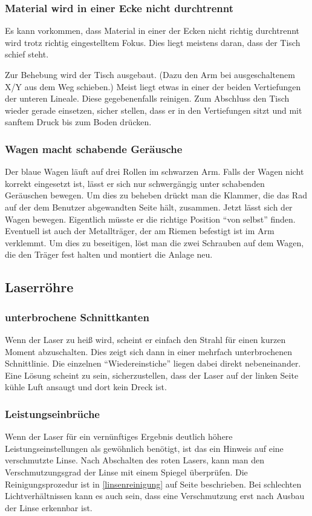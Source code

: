 \documentclass{\basedir/fablab-document}
\begin{document}
	\subsubsection{Material wird in einer Ecke nicht durchtrennt}
	Es kann vorkommen, dass Material in einer der Ecken nicht richtig durchtrennt wird trotz richtig eingestelltem Fokus. Dies liegt meistens daran, dass der Tisch schief steht.

	Zur Behebung wird der Tisch ausgebaut. (Dazu den Arm bei ausgeschaltenem X/Y aus dem Weg schieben.) Meist liegt etwas in einer der beiden Vertiefungen der unteren Lineale. Diese gegebenenfalls reinigen. Zum Abschluss den Tisch wieder gerade einsetzen, sicher stellen, dass er in den Vertiefungen sitzt und mit sanftem Druck bis zum Boden drücken.

	\subsubsection{Wagen macht schabende Geräusche}
	Der blaue Wagen läuft auf drei Rollen im schwarzen Arm. Falls der Wagen nicht korrekt eingesetzt ist, lässt er sich nur schwergängig unter schabenden Geräuschen bewegen. Um dies zu beheben drückt man die Klammer, die das Rad auf der dem Benutzer abgewandten Seite hält, zusammen. Jetzt lässt sich der Wagen bewegen. Eigentlich müsste er die richtige Position \enquote{von selbst} finden. Eventuell ist auch der Metallträger, der am Riemen befestigt ist im Arm verklemmt. Um dies zu beseitigen, löst man die zwei Schrauben auf dem Wagen, die den Träger fest halten und montiert die Anlage neu.

	\subsection{Laserröhre}
	\subsubsection{unterbrochene Schnittkanten}
	Wenn der Laser zu heiß wird, scheint er einfach den Strahl für einen kurzen Moment abzuschalten. Dies zeigt sich dann in einer mehrfach unterbrochenen Schnittlinie. Die einzelnen \enquote{Wiedereinstiche} liegen dabei direkt nebeneinander. Eine Lösung scheint zu sein, sicherzustellen, dass der Laser auf der linken Seite kühle Luft ansaugt und dort kein Dreck ist.
	\subsubsection{Leistungseinbrüche}
	Wenn der Laser für ein vernünftiges Ergebnis deutlich höhere Leistungseinstellungen als gewöhnlich benötigt, ist das ein Hinweis auf eine verschmutzte Linse. Nach Abschalten des roten Lasers, kann man den Verschmutzungsgrad der Linse mit einem Spiegel überprüfen. Die Reinigungsprozedur ist in \cref{linsenreinigung} auf Seite \pageref{linsenreinigung} beschrieben. Bei schlechten Lichtverhältnissen kann es auch sein, dass eine Verschmutzung erst nach Ausbau der Linse erkennbar ist.
\end{document}

